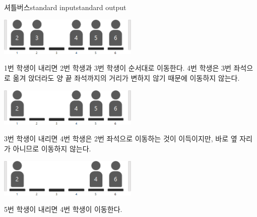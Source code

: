\begin{problem}{셔틀버스}{standard input}{standard output}
\Example

\begin{example}
%
\end{example}

\Notes

\begin{center}
  \includegraphics[width=0.5\textwidth]{bus2.png}
\end{center}
1번 학생이 내리면 2번 학생과 3번 학생이 순서대로 이동한다. 4번 학생은 3번 좌석으로 옮겨 앉더라도 양 끝 좌석까지의 거리가 변하지 않기 때문에 이동하지 않는다.

\begin{center}
  \includegraphics[width=0.5\textwidth]{bus3.png}
\end{center}
3번 학생이 내리면 4번 학생은 2번 좌석으로 이동하는 것이 이득이지만, 바로 옆 자리가 아니므로 이동하지 않는다.

\begin{center}
  \includegraphics[width=0.5\textwidth]{bus4.png}
\end{center}
5번 학생이 내리면 4번 학생이 이동한다.

\end{problem}
